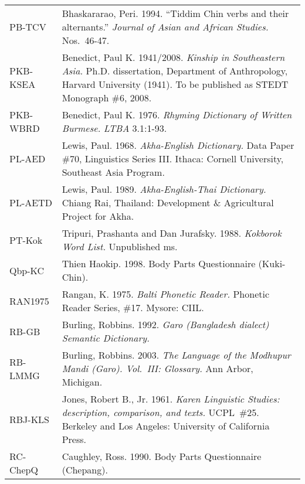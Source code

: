 {\begin{longtable}{l>{\hangindent=0.25in}p{5.6in}}
PB-TCV &
Bhaskararao, Peri.
1994.
“Tiddim Chin verbs and their alternants.”
\textit{Journal of Asian and African Studies.}  Nos.\ 46-47.
\\[0.8\parskip]

PKB-KSEA &
Benedict, Paul K.
1941/2008.
\textit{Kinship in Southeastern Asia.}
Ph.D. dissertation, Department of Anthropology, Harvard University (1941). To be published as STEDT Monograph \#6, 2008.
\\[0.8\parskip]

PKB-WBRD &
Benedict, Paul K.
1976.
\textit{Rhyming Dictionary of Written Burmese.}
\textit{LTBA} 3.1:1-93.
\\[0.8\parskip]

PL-AED &
Lewis, Paul.
1968.
\textit{Akha-English Dictionary.}
Data Paper \#70, Linguistics Series III.  Ithaca: Cornell University, Southeast Asia Program.
\\[0.8\parskip]

PL-AETD &
Lewis, Paul.
1989.
\textit{Akha-English-Thai Dictionary.}
Chiang Rai, Thailand: Development \& Agricultural Project for Akha.
\\[0.8\parskip]

PT-Kok &
Tripuri, Prashanta and Dan Jurafsky.
1988.
\textit{Kokborok Word List.}
Unpublished ms.
\\[0.8\parskip]

Qbp-KC &
Thien Haokip.
1998.
Body Parts Questionnaire (Kuki-Chin).
\\[0.8\parskip]

RAN1975 &
Rangan, K.
1975.
\textit{Balti Phonetic Reader.}
Phonetic Reader Series, \#17.  Mysore: CIIL.
\\[0.8\parskip]

RB-GB &
Burling, Robbins.
1992.
\textit{Garo (Bangladesh dialect) Semantic Dictionary.}
\\[0.8\parskip]

RB-LMMG &
Burling, Robbins.
2003.
\textit{The Language of the Modhupur Mandi (Garo). Vol.~III: Glossary.}
Ann Arbor, Michigan.
\\[0.8\parskip]

RBJ-KLS &
Jones, Robert B., Jr.
1961.
\textit{Karen Linguistic Studies:  description, comparison, and texts.}
UCPL~\#25.  Berkeley and Los Angeles: University of California Press.
\\[0.8\parskip]

RC-ChepQ &
Caughley, Ross.
1990.
Body Parts Questionnaire (Chepang).
\\[0.8\parskip]


\end{longtable}}
